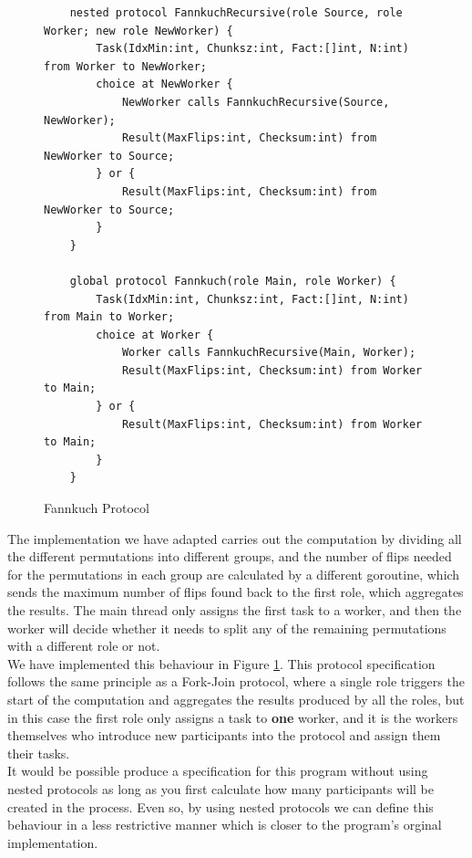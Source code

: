 \documentclass[12pt,twoside]{report}
\begin{document}
\begin{figure}[htb!]
    \centering
    \lstset{language=Scribble}
    \begin{lstlisting}
    nested protocol FannkuchRecursive(role Source, role Worker; new role NewWorker) {
        Task(IdxMin:int, Chunksz:int, Fact:[]int, N:int) from Worker to NewWorker;
        choice at NewWorker {
            NewWorker calls FannkuchRecursive(Source, NewWorker);
            Result(MaxFlips:int, Checksum:int) from NewWorker to Source;
        } or {
            Result(MaxFlips:int, Checksum:int) from NewWorker to Source;
        }
    }
    
    global protocol Fannkuch(role Main, role Worker) {
        Task(IdxMin:int, Chunksz:int, Fact:[]int, N:int) from Main to Worker;
        choice at Worker {
            Worker calls FannkuchRecursive(Main, Worker);
            Result(MaxFlips:int, Checksum:int) from Worker to Main;
        } or {
            Result(MaxFlips:int, Checksum:int) from Worker to Main;
        }
    }
    \end{lstlisting}
    \caption{Fannkuch Protocol}
    \label{fannkuch-protocol}
\end{figure}

The implementation we have adapted carries out the computation by dividing all the different permutations into different groups, and the number of flips needed for the permutations in each group are calculated by a different goroutine, which sends the maximum number of flips found back to the first role, which aggregates the results. The main thread only assigns the first task to a worker, and then the worker will decide whether it needs to split any of the remaining permutations with a different role or not.\\

We have implemented this behaviour in Figure \ref{fannkuch-protocol}. This protocol specification follows the same principle as a Fork-Join protocol, where a single role triggers the start of the computation and aggregates the results produced by all the roles, but in this case the first role only assigns a task to \textbf{one} worker, and it is the workers themselves who introduce new participants into the protocol and assign them their tasks.\\

It would be possible produce a specification for this program without using nested protocols as long as you first calculate how many participants will be created in the process. Even so, by using nested protocols we can define this behaviour in a less restrictive manner which is closer to the program's orginal implementation.
\end{document}
